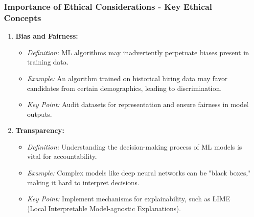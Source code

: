\documentclass[aspectratio=169]{beamer}
\begin{document}
\begin{frame}[fragile]
    \frametitle{Importance of Ethical Considerations - Key Ethical Concepts}
    \begin{enumerate}
        \item \textbf{Bias and Fairness:}
            \begin{itemize}
                \item \textit{Definition:} ML algorithms may inadvertently perpetuate biases present in training data.
                \item \textit{Example:} An algorithm trained on historical hiring data may favor candidates from certain demographics, leading to discrimination.
                \item \textit{Key Point:} Audit datasets for representation and ensure fairness in model outputs.
            \end{itemize}
        
        \item \textbf{Transparency:}
            \begin{itemize}
                \item \textit{Definition:} Understanding the decision-making process of ML models is vital for accountability.
                \item \textit{Example:} Complex models like deep neural networks can be "black boxes," making it hard to interpret decisions.
                \item \textit{Key Point:} Implement mechanisms for explainability, such as LIME (Local Interpretable Model-agnostic Explanations).
            \end{itemize}
    \end{enumerate}
\end{frame}
\end{document}

